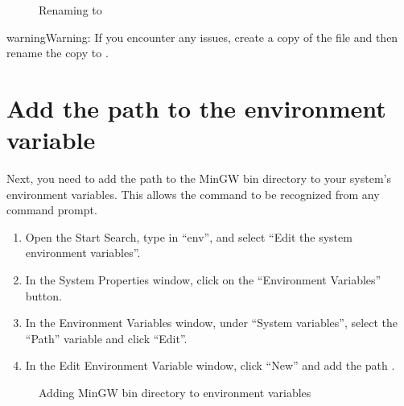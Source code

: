 \documentclass[letterpaper,10pt,english]{sphinxmanual}
\begin{document}
\begin{figure}[htbp]
\centering
\capstart

\noindent{}
\caption{Renaming  to }\label{\detokenize{install_windows:id3}}\label{\detokenize{install_windows:rename}}\end{figure}

\begin{sphinxadmonition}{warning}{Warning:}
\sphinxAtStartPar
If you encounter any issues, create a copy of the file and then rename the copy to .
\end{sphinxadmonition}


\section{Add the path to the environment variable}
\label{\detokenize{install_windows:add-the-path-to-the-environment-variable}}
\sphinxAtStartPar
Next, you need to add the path to the MinGW bin directory to your system’s environment variables. This allows the  command to be recognized from any command prompt.
\begin{enumerate}
%
\item {} 
\sphinxAtStartPar
Open the Start Search, type in “env”, and select “Edit the system environment variables”.

\item {} 
\sphinxAtStartPar
In the System Properties window, click on the “Environment Variables” button.

\item {} 
\sphinxAtStartPar
In the Environment Variables window, under “System variables”, select the “Path” variable and click “Edit”.

\item {} 
\sphinxAtStartPar
In the Edit Environment Variable window, click “New” and add the path .

\end{enumerate}

\begin{figure}[htbp]
\centering
\capstart

\noindent{}
\caption{Adding MinGW bin directory to environment variables}\label{\detokenize{install_windows:id4}}\label{\detokenize{install_windows:var-env}}\end{figure}
\end{document}
